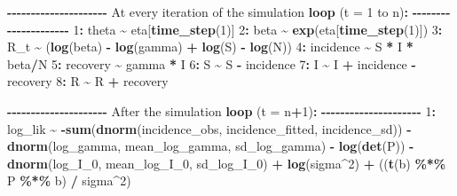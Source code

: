 \documentclass[
11pt, %
oneside, %
english, %
singlespacing, %
]{macthesis} %
\newenvironment{Shaded}{\begin{snugshade}}{\end{snugshade}}
\newcommand{\AttributeTok}[1]{\textcolor[rgb]{0.13,0.29,0.53}{#1}}
\newcommand{\DecValTok}[1]{\textcolor[rgb]{0.00,0.00,0.81}{#1}}
\newcommand{\FunctionTok}[1]{\textcolor[rgb]{0.13,0.29,0.53}{\textbf{#1}}}
\newcommand{\NormalTok}[1]{#1}
\newcommand{\SpecialCharTok}[1]{\textcolor[rgb]{0.81,0.36,0.00}{\textbf{#1}}}
\begin{document}
\begin{Shaded}
\begin{Highlighting}[]
\SpecialCharTok{{-}{-}{-}{-}{-}{-}{-}{-}{-}{-}{-}{-}{-}{-}{-}{-}{-}{-}{-}{-}{-}}
\NormalTok{At every iteration of the simulation }\FunctionTok{loop}\NormalTok{ (}\AttributeTok{t =} \DecValTok{1}\NormalTok{ to n)}\SpecialCharTok{:}
\SpecialCharTok{{-}{-}{-}{-}{-}{-}{-}{-}{-}{-}{-}{-}{-}{-}{-}{-}{-}{-}{-}{-}{-}}
\DecValTok{1}\SpecialCharTok{:}\NormalTok{ theta }\SpecialCharTok{\textasciitilde{}}\NormalTok{ eta[}\FunctionTok{time\_step}\NormalTok{(}\DecValTok{1}\NormalTok{)]}
\DecValTok{2}\SpecialCharTok{:}\NormalTok{ beta }\SpecialCharTok{\textasciitilde{}} \FunctionTok{exp}\NormalTok{(eta[}\FunctionTok{time\_step}\NormalTok{(}\DecValTok{1}\NormalTok{)])}
\DecValTok{3}\SpecialCharTok{:}\NormalTok{ R\_t }\SpecialCharTok{\textasciitilde{}}\NormalTok{ (}\FunctionTok{log}\NormalTok{(beta) }\SpecialCharTok{{-}} \FunctionTok{log}\NormalTok{(gamma) }\SpecialCharTok{+} \FunctionTok{log}\NormalTok{(S) }\SpecialCharTok{{-}} \FunctionTok{log}\NormalTok{(N))}
\DecValTok{4}\SpecialCharTok{:}\NormalTok{ incidence }\SpecialCharTok{\textasciitilde{}}\NormalTok{ S }\SpecialCharTok{*}\NormalTok{ I }\SpecialCharTok{*}\NormalTok{ beta}\SpecialCharTok{/}\NormalTok{N}
\DecValTok{5}\SpecialCharTok{:}\NormalTok{ recovery }\SpecialCharTok{\textasciitilde{}}\NormalTok{ gamma }\SpecialCharTok{*}\NormalTok{ I}
\DecValTok{6}\SpecialCharTok{:}\NormalTok{ S }\SpecialCharTok{\textasciitilde{}}\NormalTok{ S }\SpecialCharTok{{-}}\NormalTok{ incidence}
\DecValTok{7}\SpecialCharTok{:}\NormalTok{ I }\SpecialCharTok{\textasciitilde{}}\NormalTok{ I }\SpecialCharTok{+}\NormalTok{ incidence }\SpecialCharTok{{-}}\NormalTok{ recovery}
\DecValTok{8}\SpecialCharTok{:}\NormalTok{ R }\SpecialCharTok{\textasciitilde{}}\NormalTok{ R }\SpecialCharTok{+}\NormalTok{ recovery}

\SpecialCharTok{{-}{-}{-}{-}{-}{-}{-}{-}{-}{-}{-}{-}{-}{-}{-}{-}{-}{-}{-}{-}{-}}
\NormalTok{After the simulation }\FunctionTok{loop}\NormalTok{ (}\AttributeTok{t =}\NormalTok{ n}\SpecialCharTok{+}\DecValTok{1}\NormalTok{)}\SpecialCharTok{:}
\SpecialCharTok{{-}{-}{-}{-}{-}{-}{-}{-}{-}{-}{-}{-}{-}{-}{-}{-}{-}{-}{-}{-}{-}}
\DecValTok{1}\SpecialCharTok{:}\NormalTok{ log\_lik }\SpecialCharTok{\textasciitilde{}} \SpecialCharTok{{-}}\FunctionTok{sum}\NormalTok{(}\FunctionTok{dnorm}\NormalTok{(incidence\_obs, incidence\_fitted, incidence\_sd)) }\SpecialCharTok{{-}}
              \FunctionTok{dnorm}\NormalTok{(log\_gamma, mean\_log\_gamma, sd\_log\_gamma) }\SpecialCharTok{{-}} 
              \FunctionTok{log}\NormalTok{(}\FunctionTok{det}\NormalTok{(P)) }\SpecialCharTok{{-}}
              \FunctionTok{dnorm}\NormalTok{(log\_I\_0, mean\_log\_I\_0, sd\_log\_I\_0) }\SpecialCharTok{+}
              \FunctionTok{log}\NormalTok{(sigma}\SpecialCharTok{\^{}}\DecValTok{2}\NormalTok{) }\SpecialCharTok{+} 
\NormalTok{              ((}\FunctionTok{t}\NormalTok{(b) }\SpecialCharTok{\%*\%}\NormalTok{ P }\SpecialCharTok{\%*\%}\NormalTok{ b) }\SpecialCharTok{/}\NormalTok{ sigma}\SpecialCharTok{\^{}}\DecValTok{2}\NormalTok{)}
\end{Highlighting}
\end{Shaded}
\end{document}
